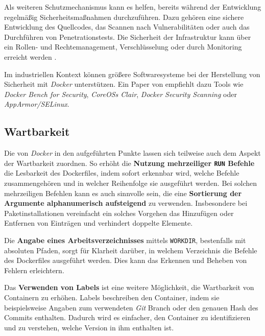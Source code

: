 Als weiteren Schutzmechanismus kann es helfen, bereits während der Entwicklung regelmäßig Sicherheitsmaßnahmen durchzuführen. Dazu gehören eine sichere Entwicklung des Quellcodes, das Scannen nach Vulnerabilitäten oder auch das Durchführen von Penetrationstests. \cite{023:Setting-up-CI-CD-Pipeline-in-the-Cloud-for-Web-Application} Die Sicherheit der Infrastruktur kann über ein Rollen- und Rechtemanagement, Verschlüsselung oder durch Monitoring erreicht werden \cite{023:Setting-up-CI-CD-Pipeline-in-the-Cloud-for-Web-Application,024:Investiugating-Impact-of-Containerization-on-Deployment-Process-in-DevOps}.

Im industriellen Kontext können größere Softwaresysteme bei der Herstellung von Sicherheit mit \textit{Docker} unterstützen. Ein Paper von \citeauthor{022:Automated-Cloud-Infrastructure-Continous-Integration-and-Continous-Delivery-using-Docker} empfiehlt dazu Tools wie \textit{Docker Bench for Security}, \textit{CoreOSs Clair}, \textit{Docker Security Scanning} oder \textit{AppArmor/SELinux}. \cite{022:Automated-Cloud-Infrastructure-Continous-Integration-and-Continous-Delivery-using-Docker}

\subsection{Wartbarkeit}
\label{subsec:05-03-03_maintainability}

Die von \textit{Docker} in den  aufgeführten Punkte lassen sich teilweise auch dem Aspekt der Wartbarkeit zuordnen. So erhöht die \textbf{Nutzung mehrzeiliger \texttt{RUN} Befehle} die Lesbarkeit des Dockerfiles, indem sofort erkennbar wird, welche Befehle zusammengehören und in welcher Reihenfolge sie ausgeführt werden. Bei solchen mehrzeiligen Befehlen kann es auch sinnvolle sein, die eine \textbf{Sortierung der Argumente alphanumerisch aufsteigend} zu verwenden. Insbesondere bei Paketinstallationen vereinfacht ein solches Vorgehen das Hinzufügen oder Entfernen von Einträgen und verhindert doppelte Elemente. \cite{300:Building-Best-Practices}

Die \textbf{Angabe eines Arbeitsverzeichnisses} mittels \texttt{WORKDIR}, bestenfalls mit absoluten Pfaden, sorgt für Klarheit darüber, in welchem Verzeichnis die Befehle des Dockerfiles ausgeführt werden. Dies kann das Erkennen und Beheben von Fehlern erleichtern. \cite{300:Building-Best-Practices}

Das \textbf{Verwenden von Labels} ist eine weitere Möglichkeit, die Wartbarkeit von Containern zu erhöhen. Labels beschreiben den Container, indem sie beispielsweise Angaben zum verwendeten \textit{Git} Branch oder den genauen Hash des Commits enthalten. Dadurch wird es einfacher, den Container zu identifizieren und zu verstehen, welche Version in ihm enthalten ist. \cite{013:Role-of-Containers-in-Reproducibility,300:Building-Best-Practices}

